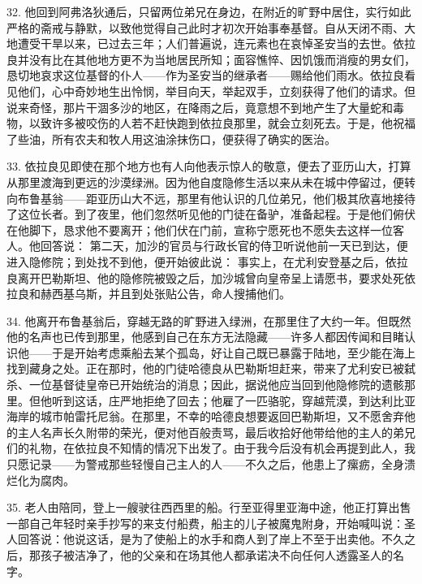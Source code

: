32. 他回到阿弗洛狄通后，只留两位弟兄在身边，在附近的旷野中居住，实行如此严格的斋戒与静默，以致他觉得自己此时才初次开始事奉基督。自从天闭不雨、大地遭受干旱以来，已过去三年；人们普遍说，连元素也在哀悼圣安当的去世。依拉良并没有比在其他地方更不为当地居民所知；面容憔悴、因饥饿而消瘦的男女们，恳切地哀求这位基督的仆人——作为圣安当的继承者——赐给他们雨水。依拉良看见他们，心中奇妙地生出怜悯，举目向天，举起双手，立刻获得了他们的请求。但说来奇怪，那片干涸多沙的地区，在降雨之后，竟意想不到地产生了大量蛇和毒物，以致许多被咬伤的人若不赶快跑到依拉良那里，就会立刻死去。于是，他祝福了些油，所有农夫和牧人用这油涂抹伤口，便获得了确实的医治。\par

33. 依拉良见即使在那个地方也有人向他表示惊人的敬意，便去了亚历山大，打算从那里渡海到更远的沙漠绿洲。因为他自度隐修生活以来从未在城中停留过，便转向布鲁基翁——距亚历山大不远，那里有他认识的几位弟兄，他们极其欣喜地接待了这位长者。到了夜里，他们忽然听见他的门徒在备驴，准备起程。于是他们俯伏在他脚下，恳求他不要离开；他们伏在门前，宣称宁愿死也不愿失去这样一位客人。他回答说： 第二天，加沙的官员与行政长官的侍卫听说他前一天已到达，便进入隐修院；到处找不到他，便开始彼此说： 事实上，在尤利安登基之后，依拉良离开巴勒斯坦、他的隐修院被毁之后，加沙城曾向皇帝呈上请愿书，要求处死依拉良和赫西基乌斯，并且到处张贴公告，命人搜捕他们。\par

34. 他离开布鲁基翁后，穿越无路的旷野进入绿洲，在那里住了大约一年。但既然他的名声也已传到那里，他感到自己在东方无法隐藏——许多人都因传闻和目睹认识他——于是开始考虑乘船去某个孤岛，好让自己既已暴露于陆地，至少能在海上找到藏身之处。正在那时，他的门徒哈德良从巴勒斯坦赶来，带来了尤利安已被弑杀、一位基督徒皇帝已开始统治的消息；因此，据说他应当回到他隐修院的遗骸那里。但他听到这话，庄严地拒绝了回去；他雇了一匹骆驼，穿越荒漠，到达利比亚海岸的城市帕雷托尼翁。在那里，不幸的哈德良想要返回巴勒斯坦，又不愿舍弃他的主人名声长久附带的荣光，便对他百般责骂，最后收拾好他带给他的主人的弟兄们的礼物，在依拉良不知情的情况下出发了。由于我今后没有机会再提到此人，我只愿记录——为警戒那些轻慢自己主人的人——不久之后，他患上了瘰疬，全身溃烂化为腐肉。\par

35. 老人由陪同，登上一艘驶往西西里的船。行至亚得里亚海中途，他正打算出售一部自己年轻时亲手抄写的来支付船费，船主的儿子被魔鬼附身，开始喊叫说：圣人回答说：他说这话，是为了使船上的水手和商人到了岸上不至于出卖他。不久之后，那孩子被洁净了，他的父亲和在场其他人都承诺决不向任何人透露圣人的名字。\par

